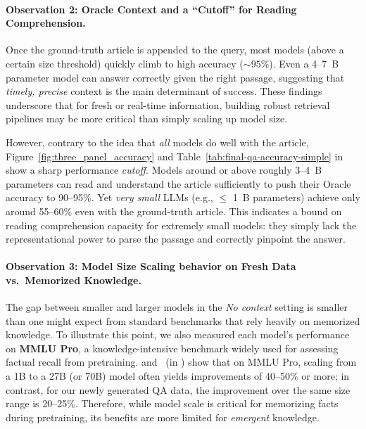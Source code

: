 \documentclass[11pt]{article}
\begin{document}
\paragraph{Observation 2: Oracle Context and a ``Cutoff'' for Reading Comprehension.} Once the ground-truth article is appended to the query, 
most models (above a certain size threshold) quickly climb to high accuracy (\(\sim95\%\)). 
Even a 4--7~B parameter model can answer correctly given the right passage, 
suggesting that \emph{timely, precise} context is the main determinant of success. 
These findings underscore that for fresh or real-time information, building robust retrieval pipelines may be more critical than simply scaling up model size.

However, contrary to the idea that \emph{all} models do well with the article, 
Figure~\ref{fig:three_panel_accuracy} and Table~\ref{tab:final-qa-accuracy-simple} in  show a sharp performance \textit{cutoff}. 
Models around or above roughly 3--4~B parameters can read and understand the article sufficiently to push their Oracle accuracy to 90--95\%. 
Yet \emph{very small} LLMs (e.g., $\leq$ 1~B parameters) achieve only around 55--60\% even with the ground-truth article. 
This indicates a bound on reading comprehension capacity for extremely small models: 
they simply lack the representational power to parse the passage and correctly pinpoint the answer. 



\paragraph{Observation 3: Model Size Scaling behavior on Fresh Data vs.\ Memorized Knowledge.}
The gap between smaller and larger models in the \emph{No context} setting is smaller than one might expect from standard benchmarks that rely heavily on memorized knowledge. To illustrate this point, we also measured each model’s performance on \textbf{MMLU Pro}, a knowledge-intensive benchmark widely used for assessing factual recall from pretraining.  and~ (in ) show that on MMLU Pro, scaling from a 1B to a 27B (or 70B) model often yields improvements of 40--50\% or more; in contrast, for our newly generated QA data, the improvement over the same size range is 20--25\%. 
Therefore, while model scale is critical for memorizing facts during pretraining, its benefits are more limited for \emph{emergent} knowledge. %
\end{document}
